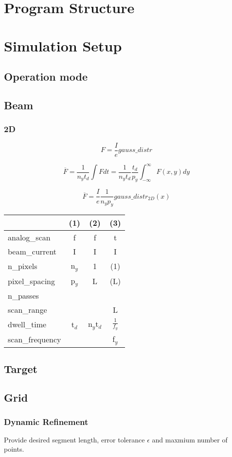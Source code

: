 \section{Program Structure}
\section{Simulation Setup}
\subsection{Operation mode}
\subsection{Beam}
\subsubsection{2D}
\begin{equation}
F = \frac{I}{e} gauss\_distr
\end{equation}

\begin{equation}
\overline{F} = \frac{1}{n_yt_d} \int{F} dt = \frac{1}{n_yt_d}\frac{t_d}{p_y} \int_{-\infty}^{\infty}{F(x,y)} dy
\end{equation}

\begin{equation}
\overline{F} = \frac{I}{e}\frac{1}{n_y p_y} gauss\_distr_{2D}(x)
\end{equation}



\begin{center}
\begin{tabular}{|l|c|c|c|}
\hline
	     & (1) & (2) & (3)\\
\hline
analog\_scan & f & f & t \\
\hline
beam\_current & I & I & I \\
\hline
n\_pixels & n$_y$ & 1 & (1) \\
\hline
pixel\_spacing & p$_y$ & L & (L) \\
\hline
n\_passes & & & \\
\hline
scan\_range & & & L\\
\hline
dwell\_time & t$_d$ &  n$_y$t$_d$ & $\frac{1}{f_y}$ \\
\hline
scan\_frequency & & & f$_y$\\
\hline
\end{tabular}
\end{center}

\subsection{Target}
\subsection{Grid}
\subsubsection{Dynamic Refinement}
Provide desired segment length, error tolerance $\epsilon$ and maxmium number of points.


